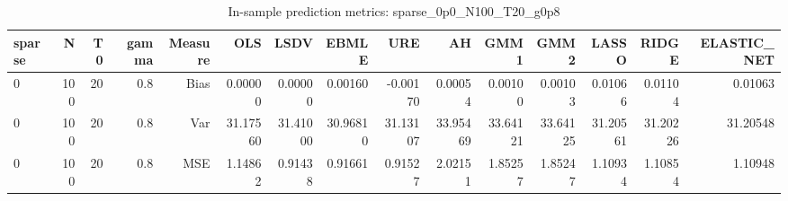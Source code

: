 \begin{table}[!htbp]\centering
\caption{In-sample prediction metrics: sparse_0p0_N100_T20_g0p8}
\label{tab:table2_sparse_0p0_N100_T20_g0p8}
\begin{tabular}{lrrrrrrrrrrrrrr}
\hline
sparse & N & T0 & gamma & Measure & OLS & LSDV & EBMLE & URE & AH & GMM1 & GMM2 & LASSO & RIDGE & ELASTIC_NET \\
\hline
0 & 100 & 20 & 0.8 & Bias & 0.00000 & 0.00000 & 0.00160 & -0.00170 & 0.00054 & 0.00100 & 0.00103 & 0.01066 & 0.01104 & 0.01063 \\
0 & 100 & 20 & 0.8 & Var & 31.17560 & 31.41000 & 30.96810 & 31.13107 & 33.95469 & 33.64121 & 33.64125 & 31.20561 & 31.20226 & 31.20548 \\
0 & 100 & 20 & 0.8 & MSE & 1.14862 & 0.91438 & 0.91661 & 0.91527 & 2.02151 & 1.85257 & 1.85247 & 1.10934 & 1.10854 & 1.10948 \\
\hline
\end{tabular}
\end{table}

